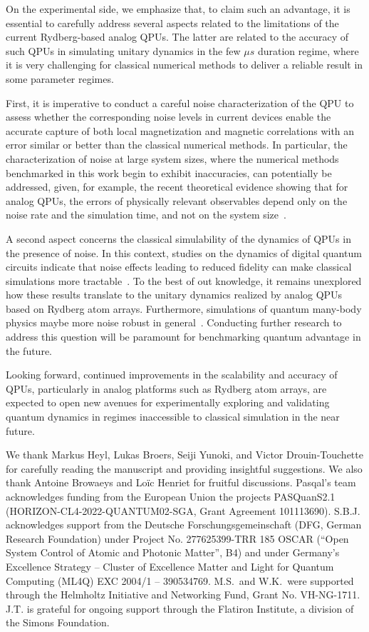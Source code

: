 \documentclass[aps,pra,reprint,amssymb,superscriptaddress]{revtex4-2}
\begin{document}
On the experimental side, we emphasize that, to claim such an advantage, it is essential to carefully address several aspects related to the limitations of the current Rydberg-based analog QPUs. The latter are related to the accuracy of such QPUs in simulating unitary dynamics in the few $\mu s$ duration regime, where it is very challenging for classical numerical methods to deliver a reliable result in some parameter regimes.

First, it is imperative to conduct a careful noise characterization of the QPU to assess whether the corresponding noise levels in current devices enable the accurate capture of both local magnetization and magnetic correlations with an error similar or better than the classical numerical methods. In particular, the characterization of noise at large system sizes, where the numerical methods benchmarked in this work begin to exhibit inaccuracies, can potentially be addressed, given, for example, the recent theoretical evidence showing that for analog QPUs, the errors of physically relevant observables depend only on the noise rate and the simulation time, and not on the system size~\cite{trivedi_quantum_2024, trivedi_noise_2025}.

A second aspect concerns the classical simulability of the dynamics of QPUs in the presence of noise. In this context, studies on the dynamics of digital quantum circuits indicate that noise effects leading to reduced fidelity can make classical simulations more tractable~\cite{ayral_density-matrix_2023,rudolph_pauli_2025}. To the best of out knowledge, it remains unexplored how these results translate to the unitary dynamics realized by analog QPUs based on Rydberg atom arrays. Furthermore, simulations of quantum many-body physics maybe more noise robust in general~\cite{trivedi_noise_2025}. Conducting further research to address this question will be paramount for benchmarking quantum advantage in the future.

Looking forward, continued improvements in the scalability and accuracy of QPUs, particularly in analog platforms such as Rydberg atom arrays, are expected to open new avenues for experimentally exploring and validating quantum dynamics in regimes inaccessible to classical simulation in the near future.

\acknowledgments
We thank Markus Heyl, Lukas Broers, Seiji Yunoki, and Victor Drouin-Touchette for carefully reading the manuscript and providing insightful suggestions. We also thank Antoine Browaeys and Loïc Henriet for fruitful discussions.
%
Pasqal's team acknowledges funding from the European Union the projects PASQuanS2.1 (HORIZON-CL4-2022-QUANTUM02-SGA, Grant Agreement 101113690). S.B.J. acknowledges support from the Deutsche Forschungsgemeinschaft (DFG, German Research Foundation) under Project No. 277625399-TRR 185 OSCAR (“Open System Control of
Atomic and Photonic Matter”, B4) and under Germany’s Excellence Strategy – Cluster of Excellence Matter and Light for Quantum Computing (ML4Q) EXC 2004/1 – 390534769.
%
M.S.~and W.K.~were supported through the Helmholtz Initiative and Networking Fund, Grant No. VH-NG-1711. 
%
J.T. is grateful for ongoing support through the Flatiron Institute, a division of the Simons Foundation.
\end{document}
